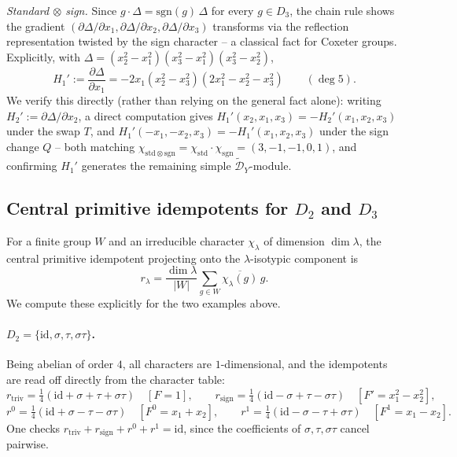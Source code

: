 \documentclass[11pt,a4paper]{article}
\begin{document}
\emph{Standard $\otimes$ sign.} Since $g\cdot\Delta = \mathrm{sgn}(g)\,\Delta$
for every $g \in D_3$, the chain rule shows the gradient
$(\partial\Delta/\partial x_1,\partial\Delta/\partial x_2,\partial\Delta/\partial x_3)$
transforms via the reflection representation twisted by the sign
character -- a classical fact for Coxeter groups. Explicitly, with
$\Delta = (x_2^2-x_1^2)(x_3^2-x_1^2)(x_3^2-x_2^2)$,
\[
  H_1' := \frac{\partial \Delta}{\partial x_1}
    = -2x_1(x_2^2-x_3^2)(2x_1^2-x_2^2-x_3^2) \qquad (\deg 5).
\]
We verify this directly (rather than relying on the general fact
alone): writing $H_2' := \partial\Delta/\partial x_2$, a direct
computation gives $H_1'(x_2,x_1,x_3) = -H_2'(x_1,x_2,x_3)$ under the
swap $T$, and $H_1'(-x_1,-x_2,x_3) = -H_1'(x_1,x_2,x_3)$ under the
sign change $Q$ -- both matching
$\chi_{\mathrm{std}\otimes\mathrm{sgn}} = \chi_{\mathrm{std}}\cdot\chi_{\mathrm{sgn}}
= (3,-1,-1,0,1)$, and confirming $H_1'$ generates the remaining
simple $\widetilde{\mathcal{D}}_Y$-module.

\subsection{Central primitive idempotents for $D_2$ and $D_3$}

For a finite group $W$ and an irreducible character $\chi_\lambda$ of
dimension $\dim\lambda$, the central primitive idempotent projecting
onto the $\lambda$-isotypic component is
\[
  r_\lambda = \frac{\dim\lambda}{|W|} \sum_{g \in W} \overline{\chi_\lambda(g)}\, g.
\]
We compute these explicitly for the two examples above.

\paragraph{$D_2 = \{\mathrm{id},\sigma,\tau,\sigma\tau\}$.}
Being abelian of order $4$, all characters are $1$-dimensional, and
the idempotents are read off directly from the character table:
\[
  r_{\mathrm{triv}} = \tfrac14(\mathrm{id}+\sigma+\tau+\sigma\tau)
  \quad [F=1],
  \qquad
  r_{\mathrm{sign}} = \tfrac14(\mathrm{id}-\sigma+\tau-\sigma\tau)
  \quad [F'=x_1^2-x_2^2],
\]
\[
  r^{0} = \tfrac14(\mathrm{id}+\sigma-\tau-\sigma\tau)
  \quad [F^0=x_1+x_2],
  \qquad
  r^{1} = \tfrac14(\mathrm{id}-\sigma-\tau+\sigma\tau)
  \quad [F^1=x_1-x_2].
\]
One checks $r_{\mathrm{triv}}+r_{\mathrm{sign}}+r^0+r^1=\mathrm{id}$,
since the coefficients of $\sigma,\tau,\sigma\tau$ cancel pairwise.
\end{document}
